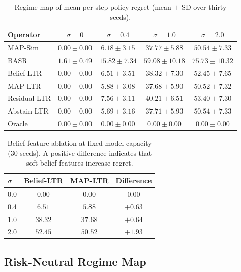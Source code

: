 \documentclass[journal]{IEEEtran}
\begin{document}
\begin{table}[t]
\centering
\caption{Regime map of mean per-step policy regret (mean \(\pm\) SD over thirty seeds).}
\label{tab:regime}
\scriptsize
\setlength{\tabcolsep}{3.0pt}
\begin{tabular}{@{}lcccc@{}}
\toprule
Operator & \(\sigma=0\) & \(\sigma=0.4\) & \(\sigma=1.0\) & \(\sigma=2.0\) \\
\midrule
MAP-Sim & \(0.00\pm0.00\) & \(6.18\pm3.15\) & \(37.77\pm5.88\) & \(50.54\pm7.33\) \\
BASR & \(1.61\pm0.49\) & \(15.82\pm7.34\) & \(59.08\pm10.18\) & \(75.73\pm10.32\) \\
Belief-LTR & \(0.00\pm0.00\) & \(6.51\pm3.51\) & \(38.32\pm7.30\) & \(52.45\pm7.65\) \\
MAP-LTR & \(0.00\pm0.00\) & \(5.88\pm3.08\) & \(37.68\pm5.90\) & \(50.52\pm7.32\) \\
Residual-LTR & \(0.00\pm0.00\) & \(7.56\pm3.11\) & \(40.21\pm6.51\) & \(53.40\pm7.30\) \\
Abstain-LTR & \(0.00\pm0.00\) & \(5.69\pm3.16\) & \(37.71\pm5.93\) & \(50.54\pm7.33\) \\
Oracle & \(0.00\pm0.00\) & \(0.00\pm0.00\) & \(0.00\pm0.00\) & \(0.00\pm0.00\) \\
\bottomrule
\end{tabular}
\end{table}

\begin{table}[t]
\centering
\caption{Belief-feature ablation at fixed model capacity (30 seeds). A positive difference indicates that soft belief features increase regret.}
\label{tab:ablation}
\footnotesize
\begin{tabular}{@{}lccc@{}}
\toprule
\(\sigma\) & Belief-LTR & MAP-LTR & Difference \\
\midrule
0.0 & \(0.00\) & \(0.00\) & \(0.00\) \\
0.4 & \(6.51\) & \(5.88\) & \(+0.63\) \\
1.0 & \(38.32\) & \(37.68\) & \(+0.64\) \\
2.0 & \(52.45\) & \(50.52\) & \(+1.93\) \\
\bottomrule
\end{tabular}
\end{table}

\subsection{Risk-Neutral Regime Map}
\label{sec:comparison}
\end{document}
